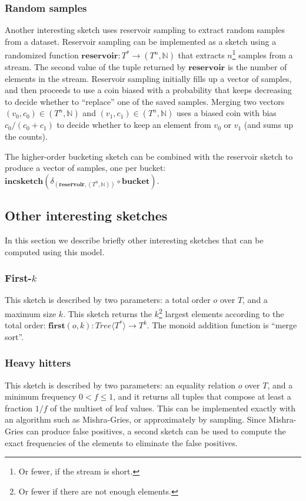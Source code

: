 \documentclass{article}
\newcommand{\tree}[1]{\mathit{Tree}\langle #1 \rangle}
\newcommand{\mr}[1]{\ensuremath{\mathrm{\mathbf{#1}}}}
\newcommand{\N}{\ensuremath{\mathbb{N}}\xspace}
\begin{document}
\subsubsection{Random samples\label{sec:random-samples}}

Another interesting sketch uses reservoir sampling to extract random
samples from a dataset.  Reservoir sampling can be implemented as a
sketch using a randomized function $\mr{reservoir}: T^* \rightarrow
(T^n, \N)$ that extracts $n$\footnote{Or fewer, if the stream is
  short.} samples from a stream.  The second value of the tuple
returned by \mr{reservoir} is the number of elements in the stream.
Reservoir sampling initially fills up a vector of samples, and then
proceeds to use a coin biased with a probability that keeps decreasing
to decide whether to ``replace'' one of the saved samples.  Merging
two vectors $(v_0, c_0) \in (T^n, \N)$ and $(v_1, c_1) \in (T^n, \N)$
uses a biased coin with bias $c_0 / (c_0 + c_1)$ to decide whether to
keep an element from $v_0$ or $v_1$ (and sums up the counts).

The higher-order bucketing sketch can be combined with the reservoir
sketch to produce a vector of samples, one per bucket:
$\mr{incsketch}(\delta_{(\mr{reservoir}, (T^n, \N))} \circ
\mr{bucket})$.

\subsection{Other interesting sketches}

In this section we describe briefly other interesting sketches that
can be computed using this model.

\subsubsection{First-$k$}

This sketch is described by two parameters: a total order $o$ over
$T$, and a maximum size $k$.  This sketch returns the $k$\footnote{Or
  fewer if there are not enough elements.} largest elements according
to the total order: $\mr{first}(o, k): \tree{T^*} \rightarrow T^k$.
The monoid addition function is ``merge sort''.

\subsubsection{Heavy hitters}

This sketch is described by two parameters: an equality relation $o$
over $T$, and a minimum frequency $0 < f \leq 1$, and it returns all
tuples that compose at least a fraction $1/f$ of the multiset of leaf
values.  This can be implemented exactly with an algorithm such as
Mishra-Gries, or approximately by sampling.  Since Mishra-Gries can
produce false positives, a second sketch can be used to compute the
exact frequencies of the elements to eliminate the false positives.
\end{document}
